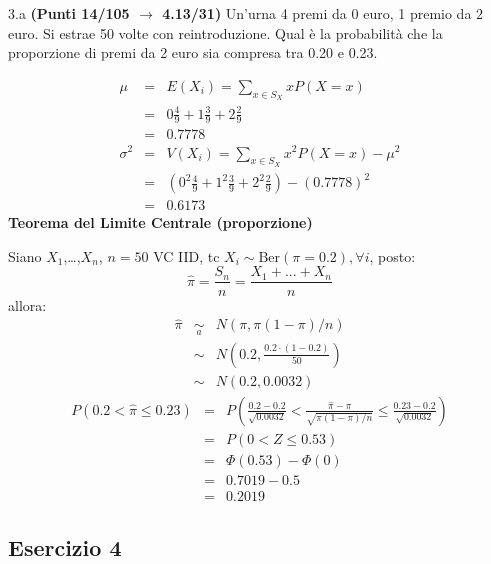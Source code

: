 \documentclass[
  11pt,
]{book}
\theoremstyle{mytheoremstyle}
\theoremstyle{mydefstyle}
\newenvironment{sol}
  {
  \begin{tcolorbox}[enhanced,breakable,arc=0.1mm,boxrule=1pt,colback=white,colframe=iblue,
  title=\bf \fontfamily{lmss}\selectfont \hspace{.5 cm} Soluzione,drop fuzzy shadow]

}{
\end{tcolorbox}
  }
\begin{document}
3.a \textbf{(Punti 14/105 \(\rightarrow\) 4.13/31)} Un'urna 4 premi da \(\mbox{0}\) euro, 1 premio da \(\mbox{2}\) euro.
Si estrae 50 volte con reintroduzione.
Qual è la probabilità che la proporzione di premi da 2 euro sia compresa tra 0.20 e 0.23.

\begin{sol}
\begin{eqnarray*} \mu &=& E(X_i) = \sum_{x\in S_X}x P(X=x)\\ 
 &=&  0  \frac { 4 }{ 9 }+ 1  \frac { 3 }{ 9 }+ 2  \frac { 2 }{ 9 } \\ 
            &=& 0.7778 \\ 
 \sigma^2 &=& V(X_i) = \sum_{x\in S_X}x^2 P(X=x)-\mu^2\\ 
 &=&\left(  0  ^2\frac { 4 }{ 9 }+ 1  ^2\frac { 3 }{ 9 }+ 2  ^2\frac { 2 }{ 9 } \right)-( 0.7778 )^2\\ 
            &=& 0.6173 
\end{eqnarray*}
\textbf{Teorema del Limite Centrale (proporzione)}

Siano \(X_1\),\ldots,\(X_n\), \(n=50\) VC IID, tc \(X_i\sim\text{Ber}(\pi=0.2)\)\(,\forall i\), posto:
\[
      \hat\pi=\frac{S_n}n = \frac{X_1 + ... + X_n}n
      \]
allora:\begin{eqnarray*}
  \hat\pi & \mathop{\sim}\limits_{a}& N(\pi,\pi(1-\pi)/n) \\
  &\sim & N\left(0.2,\frac{0.2\cdot(1-0.2)}{50}\right) \\
     &\sim & N(0.2,0.0032) 
  \end{eqnarray*}\begin{eqnarray*}
   P( 0.2 < \hat\pi \leq  0.23 ) &=& P\left( \frac { 0.2  -  0.2 }{\sqrt{ 0.0032 }} < \frac { \hat\pi  -  \pi }{ \sqrt{\pi(1-\pi)/n} } \leq \frac { 0.23  -  0.2 }{\sqrt{ 0.0032 }}\right)  \\
              &=& P\left(  0  < Z \leq  0.53 \right) \\
              &=& \Phi( 0.53 )-\Phi( 0 )\\
              &=&  0.7019 - 0.5 \\ 
              &=&  0.2019 
   \end{eqnarray*}

\end{sol}

\subsection{Esercizio 4}\label{esercizio-4-38}
\end{document}
